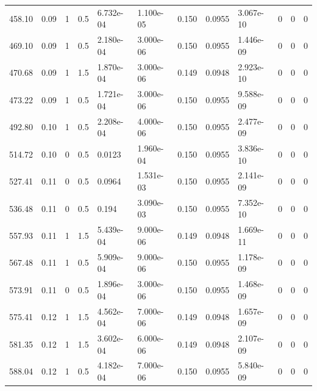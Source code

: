 \documentclass[preview]{standalone}
\begin{document}
{{\begin{tabular}{L{1.2cm}C{1.2cm} C{0.3cm}C{0.5cm} C{1.4cm}C{1.4cm} C{1.4cm}C{1.4cm} C{1.6cm}C{1.6cm} C{1.6cm}C{1.6cm}}
  458.10  &  0.09  & 1     & 0.5 &  6.732e-04  & 1.100e-05  &  0.150&   0.0955& 3.067e-10 & 0   &  0 & 0  \\ 
  469.10  &  0.09  & 1     & 0.5 &  2.180e-04  & 3.000e-06  &  0.150&   0.0955& 1.446e-09 & 0   &  0 & 0  \\ 
  470.68  &  0.09  & 1     & 1.5 &  1.870e-04  & 3.000e-06  &  0.149&   0.0948& 2.923e-10 & 0   &  0 & 0  \\ 
  473.22  &  0.09  & 1     & 0.5 &  1.721e-04  & 3.000e-06  &  0.150&   0.0955& 9.588e-09 & 0   &  0 & 0  \\ 
  492.80  &  0.10  & 1     & 0.5 &  2.208e-04  & 4.000e-06  &  0.150&   0.0955& 2.477e-09 & 0   &  0 & 0  \\ 
  514.72  &  0.10  & 0     & 0.5 &  0.0123  & 1.960e-04  &  0.150&   0.0955& 3.836e-10 & 0   &  0 & 0  \\ 
  527.41  &  0.11  & 0     & 0.5 &  0.0964  & 1.531e-03  &  0.150&   0.0955& 2.141e-09 & 0   &  0 & 0  \\ 
  536.48  &  0.11  & 0     & 0.5 &  0.194  & 3.090e-03  &  0.150&   0.0955& 7.352e-10 & 0   &  0 & 0  \\ 
  557.93  &  0.11  & 1     & 1.5 &  5.439e-04  & 9.000e-06  &  0.149&   0.0948& 1.669e-11 & 0   &  0 & 0  \\ 
  567.48  &  0.11  & 1     & 0.5 &  5.909e-04  & 9.000e-06  &  0.150&   0.0955& 1.178e-09 & 0   &  0 & 0  \\ 
  573.91  &  0.11  & 0     & 0.5 &  1.896e-04  & 3.000e-06  &  0.150&   0.0955& 1.468e-09 & 0   &  0 & 0  \\ 
  575.41  &  0.12  & 1     & 1.5 &  4.562e-04  & 7.000e-06  &  0.149&   0.0948& 1.657e-09 & 0   &  0 & 0  \\ 
  581.35  &  0.12  & 1     & 1.5 &  3.602e-04  & 6.000e-06  &  0.149&   0.0948& 2.107e-09 & 0   &  0 & 0  \\ 
  588.04  &  0.12  & 1     & 0.5 &  4.182e-04  & 7.000e-06  &  0.150&   0.0955& 5.840e-09 & 0   &  0 & 0  \\ 
\hline 
\end{tabular} 

}}
\end{document}
